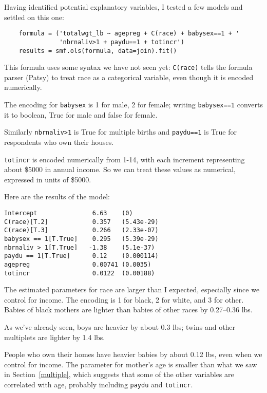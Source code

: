 \documentclass[12pt]{book}
\begin{document}
Having identified potential explanatory variables, I tested a few
models and settled on this one:

\begin{verbatim}
    formula = ('totalwgt_lb ~ agepreg + C(race) + babysex==1 + '
               'nbrnaliv>1 + paydu==1 + totincr')
    results = smf.ols(formula, data=join).fit()
\end{verbatim}

This formula uses some syntax we have not seen yet:
{\tt C(race)} tells the formula parser (Patsy) to treat race as a
categorical variable, even though it is encoded numerically.

The encoding for {\tt babysex} is 1 for male, 2 for female; writing
{\tt babysex==1} converts it to boolean, True for male and false for
female.

Similarly {\tt nbrnaliv>1} is True for multiple births and 
{\tt paydu==1} is True for respondents who own their houses.

{\tt totincr} is encoded numerically from 1-14, with each increment
representing about \$5000 in annual income.  So we can treat these
values as numerical, expressed in units of \$5000.

Here are the results of the model:

\begin{verbatim}
Intercept               6.63    (0)
C(race)[T.2]            0.357   (5.43e-29)
C(race)[T.3]            0.266   (2.33e-07)
babysex == 1[T.True]    0.295   (5.39e-29)
nbrnaliv > 1[T.True]   -1.38    (5.1e-37)
paydu == 1[T.True]      0.12    (0.000114)
agepreg                 0.00741 (0.0035)
totincr                 0.0122  (0.00188)
\end{verbatim}

The estimated parameters for race are larger than I expected,
especially since we control for income.  The encoding
is 1 for black, 2 for white, and 3 for other.  Babies of black
mothers are lighter than babies of other races by 0.27--0.36 lbs.

As we've already seen, boys are heavier by about 0.3 lbs;
twins and other multiplets are lighter by 1.4 lbs.

People who own their homes have heavier babies by about 0.12 lbs,
even when we control for income.  The parameter for mother's
age is smaller than what we saw in Section~\ref{multiple}, which
suggests that some of the other variables are correlated with
age, probably including {\tt paydu} and {\tt totincr}.
\end{document}
